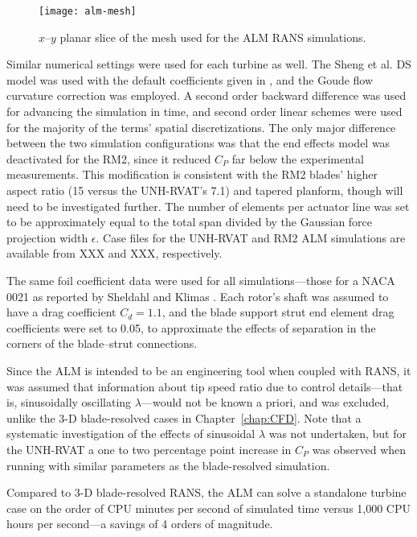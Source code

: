 \begin{figure}
    \centering

    \texttt{[image: alm-mesh]}

    \caption{$x$--$y$ planar slice of the mesh used for the ALM RANS
        simulations.}

    \label{fig:ALM-mesh}
\end{figure}

Similar numerical settings were used for each turbine as well. The Sheng et al.
DS model was used with the default coefficients given in \cite{Sheng2008}, and
the Goude flow curvature correction was employed. A second order backward
difference was used for advancing the simulation in time, and second order
linear schemes were used for the majority of the terms' spatial discretizations.
The only major difference between the two simulation configurations was that the
end effects model was deactivated for the RM2, since it reduced $C_P$ far below
the experimental measurements. This modification is consistent with the RM2
blades' higher aspect ratio (15 versus the UNH-RVAT's 7.1) and tapered planform,
though will need to be investigated further. The number of elements per actuator
line was set to be approximately equal to the total span divided by the Gaussian
force projection width $\epsilon$. Case files for the UNH-RVAT and RM2 ALM
simulations are available from XXX and XXX, respectively. 

The same foil coefficient data were used for all simulations---those for a NACA
0021 as reported by Sheldahl and Klimas \cite{Sheldahl1981}. Each rotor's shaft
was assumed to have a drag coefficient $C_d = 1.1$, and the blade support strut
end element drag coefficients were set to 0.05, to approximate the effects of
separation in the corners of the blade--strut connections.

Since the ALM is intended to be an engineering tool when coupled with RANS, it
was assumed that information about tip speed ratio due to control details---that
is, sinusoidally oscillating $\lambda$---would not be known a priori, and was
excluded, unlike the 3-D blade-resolved cases in Chapter~\ref{chap:CFD}. Note
that a systematic investigation of the effects of sinusoidal $\lambda$ was not
undertaken, but for the UNH-RVAT a one to two percentage point increase in $C_P$
was observed when running with similar parameters as the blade-resolved
simulation.

Compared to 3-D blade-resolved RANS, the ALM can solve a standalone turbine case
on the order of CPU minutes per second of simulated time versus 1,000 CPU hours
per second---a savings of 4 orders of magnitude.


